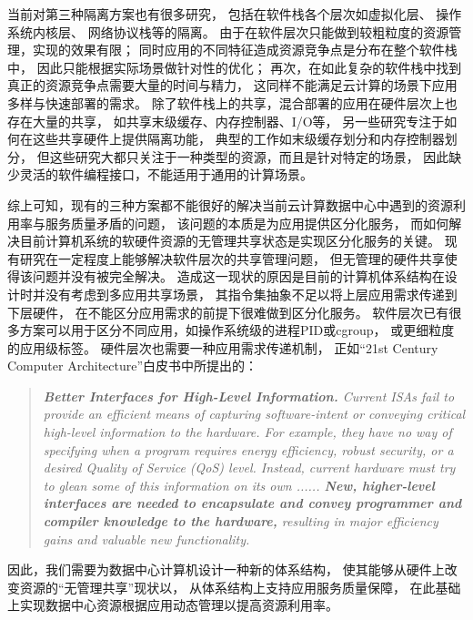 当前对第三种隔离方案也有很多研究，
包括在软件栈各个层次如虚拟化层\cite{}、
操作系统内核层\cite{}、
网络协议栈\cite{}等的隔离。
由于在软件层次只能做到较粗粒度的资源管理，实现的效果有限；
同时应用的不同特征造成资源竞争点是分布在整个软件栈中，
因此只能根据实际场景做针对性的优化；
再次，在如此复杂的软件栈中找到真正的资源竞争点需要大量的时间与精力，
这同样不能满足云计算的场景下应用多样与快速部署的需求。
除了软件栈上的共享，混合部署的应用在硬件层次上也存在大量的共享，
如共享末级缓存、内存控制器、I/O等，
另一些研究专注于如何在这些共享硬件上提供隔离功能，
典型的工作如末级缓存划分\cite{}和内存控制器划分\cite{}，
但这些研究大都只关注于一种类型的资源，而且是针对特定的场景，
因此缺少灵活的软件编程接口，不能适用于通用的计算场景。

综上可知，现有的三种方案都不能很好的解决当前云计算数据中心中遇到的资源利用率与服务质量矛盾的问题，
该问题的本质是为应用提供区分化服务，
而如何解决目前计算机系统的软硬件资源的无管理共享状态是实现区分化服务的关键。
现有研究在一定程度上能够解决软件层次的共享管理问题，
但无管理的硬件共享使得该问题并没有被完全解决。
造成这一现状的原因是目前的计算机体系结构在设计时并没有考虑到多应用共享场景，
其指令集抽象不足以将上层应用需求传递到下层硬件，
在不能区分应用需求的前提下很难做到区分化服务。
软件层次已有很多方案可以用于区分不同应用，如操作系统级的进程PID或cgroup，
或更细粒度的应用级标签\cite{timecard:2013,d2p:2014,}。%
硬件层次也需要一种应用需求传递机制，
正如``21st Century Computer Architecture''白皮书中所提出的：

\begin{quotation} 
\emph{\textbf{Better Interfaces for High-Level Information.}
Current ISAs fail to provide an efficient means of capturing software-intent or conveying critical high-level information to the hardware.
For example, they have no way of specifying when a program requires energy efficiency, robust security, or a desired Quality of Service (QoS) level.
Instead, current hardware must try to glean some of this information on its own ......
\textbf{New, higher-level interfaces are needed to encapsulate and convey programmer and compiler knowledge to the hardware,}
resulting in major efficiency gains and valuable new functionality.}\cite{21st_architecture}
\end{quotation}

因此，我们需要为数据中心计算机设计一种新的体系结构，
使其能够从硬件上改变资源的``无管理共享''现状以，
从体系结构上支持应用服务质量保障，
在此基础上实现数据中心资源根据应用动态管理以提高资源利用率。

